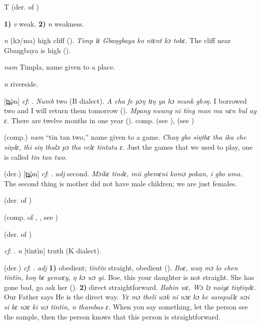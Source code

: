 \begin{letter}{T}
 (der. of ) 

 \textbf{1)} \textit{v} weak. \textbf{2)} \textit{n} weakness.

 \textit{n} (kɔ/ma) high cliff (\citealt{Pichl1967}). \textit{Timp lɛ Gbaŋgbaya ko ntɛnt kɔ tokɛ.} The cliff near Gbaŋgbaya is high (\citealt{Pichl1967}). 

 \textit{nam} Timpla, name given to a place. 

 \textit{n} riverside.

 [t̪s̪ə̀n] \textit{cf}: . \textit{Numb} two (B dialect). \textit{A cha fe pɔŋ tɪŋ ya hɔ munk gbəŋ.} I borrowed two and I will return them tomorrow (\citealt{Pichl1967}). \textit{Mpang nwang ni tïng man ma nɛn bul ay ɛ.} There are twelve months in one year (\citealt{Pichl1967}). comp.  (see ),  (see ) 

 (comp.) \textit{nam} “tin tan two,” name given to a game. \textit{Chaŋ gbo siŋthɛ tha ika che siŋdɛ, thi siŋ thalɔ pɔ tha velɛ tintatu ɛ.} Just the games that we used to play, one is called \textit{tin tan two.}
 
 (der.) [t̪s̪ə̀n] \textit{cf}: . \textit{adj} second. \textit{Mɔikɛ tindɛ, mii gbemɛni komɔ pokan, i gbo ama.} The second thing is mother did not have male children; we are just females.

 (der. of ) 

 (comp. of , , see ) 

 (der. of ) 

 \textit{cf}: . \textit{n} [tìntìn] truth (K dialect). 

 (der.) \textit{cf}: . \textit{adj} \textbf{1)} obedient; \textit{tïntïn} straight, obedient (\citealt{Pichl1967}). \textit{Boɛ, waŋ mɔ lo chen tïntïn, koŋ bɛ yenwɛy, ŋ kɔ wɔ yi.} Boe, this your daughter is not straight. She has gone bad, go ask her (\citealt{Pichl1967}). \textbf{2)} direct straightforward. \textit{Bahin wɛ, Wɔ lɔ naiyɛ tiŋtiŋdɛ.} Our Father says He is the direct way. \textit{Yɛ mɔ theli wɔk ni nɔɛ kɔ ke sampullɛ wɔi si kɛ nɔɛ ki wɔ tintin, n thambas ɛ.} When you say something, let the person see the sample, then the person knows that this person is straightforward.


\end{letter}
